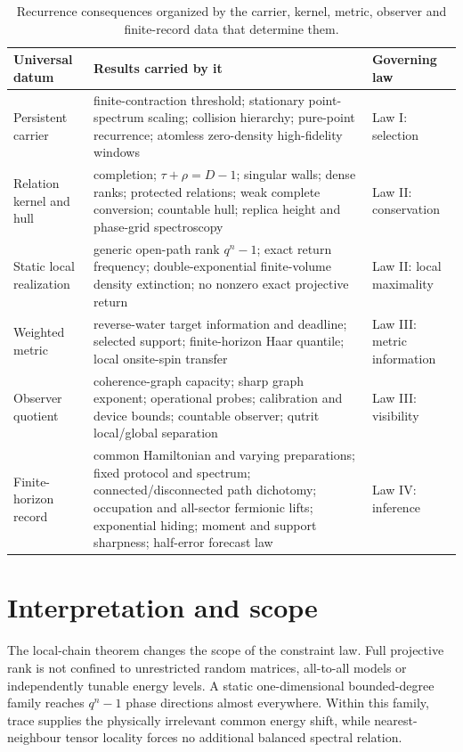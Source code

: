 \documentclass[10pt]{article}
\theoremstyle{definition}
\begin{document}
\begin{table}[H]
\centering
\small
\begin{tabularx}{\textwidth}{@{}p{}X p{}@{}}
\toprule
Universal datum & Results carried by it & Governing law \\
\midrule
Persistent carrier & finite-contraction threshold; stationary point-spectrum
scaling; collision hierarchy; pure-point recurrence; atomless zero-density
high-fidelity windows & Law I: selection \\
Relation kernel and hull & completion; $\tau+\rho=D-1$; singular walls;
dense ranks; protected relations; weak complete conversion; countable hull;
replica height and phase-grid spectroscopy & Law II: conservation \\
Static local realization & generic open-path rank $q^n-1$; exact return
frequency; double-exponential finite-volume density extinction; no nonzero
exact projective return & Law II: local maximality \\
Weighted metric & reverse-water target information and deadline; selected
support; finite-horizon Haar quantile; local onsite-spin transfer & Law III:
metric information \\
Observer quotient & coherence-graph capacity; sharp graph exponent;
operational probes; calibration and device bounds; countable observer;
qutrit local/global separation & Law III: visibility \\
Finite-horizon record & common Hamiltonian and varying preparations; fixed protocol
and spectrum; connected/disconnected path dichotomy; occupation and all-sector
fermionic lifts; exponential hiding; moment and support sharpness; half-error
forecast law & Law IV: inference \\
\bottomrule
\end{tabularx}
\caption{Recurrence consequences organized by the carrier, kernel, metric,
observer and finite-record data that determine them.}
\label{tab:shadows}
\end{table}

\section{Interpretation and scope}

The local-chain theorem changes the scope of the constraint law.  Full
projective rank is not confined to unrestricted random matrices, all-to-all
models or independently tunable energy levels.  A static one-dimensional
bounded-degree family reaches $q^n-1$ phase directions almost everywhere.
Within this family, trace supplies the physically irrelevant common energy
shift, while nearest-neighbour tensor locality forces no additional balanced
spectral relation.
\end{document}
